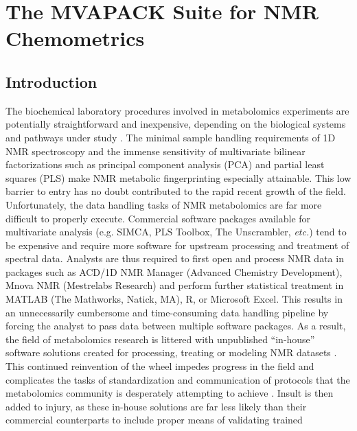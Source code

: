 
\chapter{The MVAPACK Suite for NMR Chemometrics}

\section{Introduction}

\begin{doublespace}
The biochemical laboratory procedures involved in metabolomics experiments
are potentially straightforward and inexpensive, depending on the biological
systems and pathways under study \cite{zhang:jiomic2013}. The minimal sample
handling requirements of 1D \hnmr{} NMR spectroscopy and the immense
sensitivity of multivariate bilinear factorizations such as principal component
analysis (PCA) and partial least squares (PLS) make NMR metabolic
fingerprinting especially attainable. This low barrier to entry has no doubt
contributed to the rapid recent growth of the field. Unfortunately, the data
handling tasks of NMR metabolomics are far more difficult to properly execute.
Commercial software packages available for multivariate analysis (e.g. SIMCA,
PLS Toolbox, The Unscrambler, {\it etc.}) tend to be expensive and require more
software for upstream processing and treatment of spectral data. Analysts are
thus required to first open and process NMR data in packages such as ACD/1D NMR
Manager (Advanced Chemistry Development), Mnova NMR (Mestrelabs Research) and
perform further statistical treatment in MATLAB (The Mathworks, Natick, MA), R,
or Microsoft Excel. This results in an unnecessarily cumbersome and
time-consuming data handling pipeline by forcing the analyst to pass data
between multiple software packages. As a result, the field of metabolomics
research is littered with unpublished ``in-house'' software solutions created
for processing, treating or modeling NMR datasets
\cite{viant:bbrc2003,
      verhoeckx:immpc2004,
      cloarec:anchem2005a,
      cloarec:anchem2005b,
      dieterle:anchem2006,
      kang:food2008,
      wiklund:anchem2008}. This continued reinvention of the wheel impedes
progress in the field and complicates the tasks of standardization and
communication of protocols that the metabolomics community is desperately
attempting to achieve \cite{lindon:nbiot2005,goodacre:metab2007}. Insult is
then added to injury, as these in-house solutions are far less likely than
their commercial counterparts to include proper means of validating trained

\end{doublespace}

